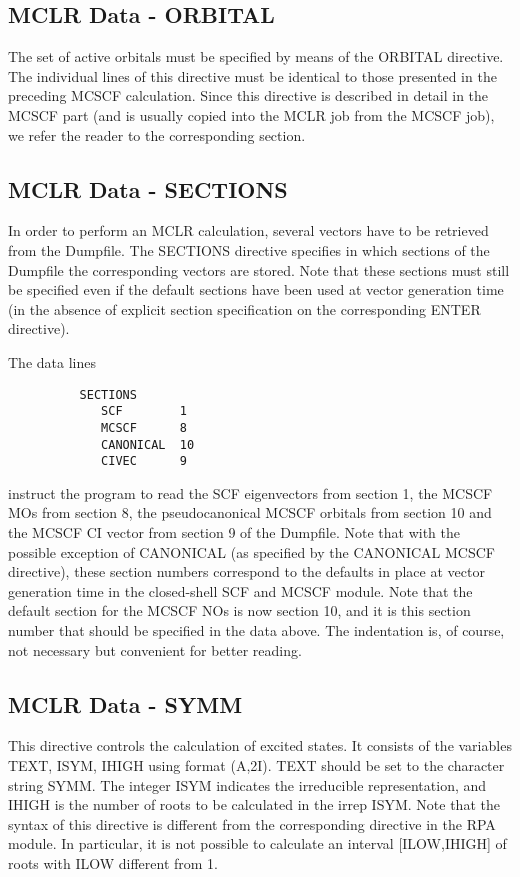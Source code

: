 \documentclass[11pt,fleqn]{article}
\begin{document}
\subsection{MCLR Data - ORBITAL}
The set of active orbitals must be specified by means of the ORBITAL
directive. The individual lines of this directive must be identical 
to those presented in the preceding MCSCF calculation.
Since this directive is described in detail in the
MCSCF part (and is usually copied into the MCLR job
from the MCSCF job), we refer the reader to the corresponding
section.
%
\subsection{MCLR Data - SECTIONS}
In order to perform an MCLR calculation, several vectors have to be
retrieved from the Dumpfile. The SECTIONS directive specifies in which
sections of the Dumpfile the corresponding vectors are stored. Note that
these sections must still be specified even if the default sections have
been used at vector generation time (in the absence of explicit section
specification on the corresponding ENTER directive).

The data lines

{
\footnotesize
\begin{verbatim}
          SECTIONS
             SCF        1
             MCSCF      8
             CANONICAL  10
             CIVEC      9
\end{verbatim}
}
instruct the program to read the SCF eigenvectors from section 1,
the MCSCF MOs from section 8, the pseudocanonical MCSCF orbitals from
section 10 and the MCSCF CI vector from section 9 of the Dumpfile. Note
that with the possible exception of CANONICAL (as specified by the CANONICAL MCSCF
directive), these section numbers correspond to the defaults in place
at vector generation time in the closed-shell SCF and MCSCF module.
Note that the default section for the MCSCF NOs is now section 10, and
it is this section number that should be specified in the data above.
The indentation is, of course, not necessary but convenient for better
reading.

%
\subsection{MCLR Data - SYMM}
This directive controls the calculation of excited states. 
It consists of the variables TEXT, ISYM, IHIGH using format (A,2I).
TEXT should be set to the character string SYMM. The integer ISYM
indicates the irreducible representation, and IHIGH is the number 
of roots to be calculated in the irrep ISYM. Note that the syntax
of this directive is different from the corresponding directive
in the RPA module. In particular, it is not possible to calculate
an interval [ILOW,IHIGH] of roots with ILOW different from 1.
%
\end{document}
